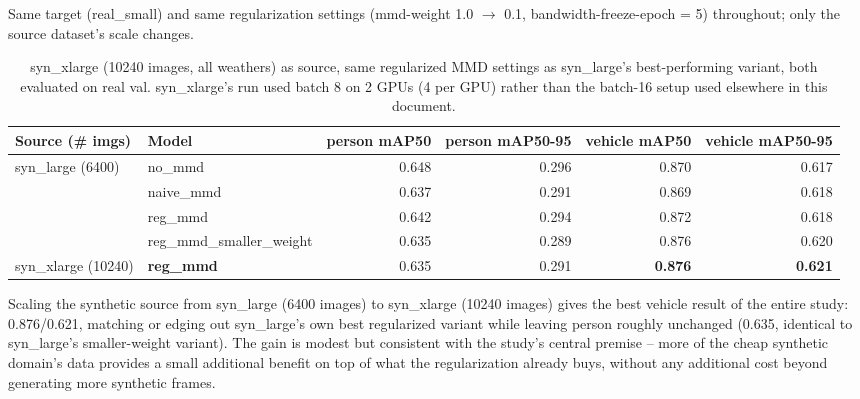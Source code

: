 \documentclass[11pt]{article}
\begin{document}
Same target (real\_small) and same regularization settings (mmd-weight 1.0 $\to$ 0.1,
bandwidth-freeze-epoch = 5) throughout; only the source dataset's scale changes.

\begin{table}[h!]
    \centering
    \setlength{\tabcolsep}{3pt}
    \small
    \begin{tabular}{llrrrr}
        \toprule
        Source (\# imgs) & Model & person mAP50 & person mAP50-95 & vehicle mAP50 & vehicle mAP50-95 \\
        \midrule
        \multirow{4}{*}{syn\_large (6400)} & no\_mmd & 0.648 & 0.296 & 0.870 & 0.617 \\
        & naive\_mmd & 0.637 & 0.291 & 0.869 & 0.618 \\
        & reg\_mmd & 0.642 & 0.294 & 0.872 & 0.618 \\
        & reg\_mmd\_smaller\_weight & 0.635 & 0.289 & 0.876 & 0.620 \\
        \midrule
        syn\_xlarge (10240) & \textbf{reg\_mmd} & 0.635 & 0.291 & \textbf{0.876} & \textbf{0.621} \\
        \bottomrule
    \end{tabular}
    \caption{syn\_xlarge (10240 images, all weathers) as source, same regularized MMD
    settings as syn\_large's best-performing variant, both evaluated on real val.
    syn\_xlarge's run used batch 8 on 2 GPUs (4 per GPU) rather than the batch-16
    setup used elsewhere in this document.}
\end{table}

\noindent Scaling the synthetic source from syn\_large (6400 images) to syn\_xlarge
(10240 images) gives the best vehicle result of the entire study: 0.876/0.621, matching
or edging out syn\_large's own best regularized variant while leaving person roughly
unchanged (0.635, identical to syn\_large's smaller-weight variant). The gain is modest
but consistent with the study's central premise -- more of the cheap synthetic domain's
data provides a small additional benefit on top of what the regularization already
buys, without any additional cost beyond generating more synthetic frames.
\end{document}
